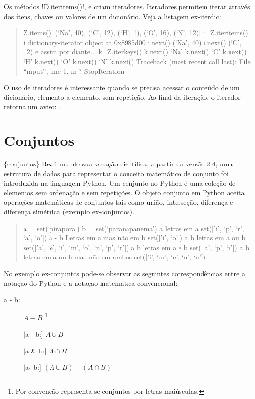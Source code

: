 \documentclass[a4paper,10pt,brazil]{sphinxmanual}
\begin{document}
Os métodos !D.iteritems()!,  e 
criam iteradores. Iteradores permitem iterar através dos ítens,
chaves ou valores de um dicionário. Veja a listagem ex-iterdic:
\begin{quote}

Z.items() {[}(`Na', 40), (`C', 12), (`H', 1), (`O', 16), (`N', 12){]}
i=Z.iteritems() i dictionary-iterator object at 0x8985d00 i.next()
(`Na', 40) i.next() (`C', 12) e assim por diante... k=Z.iterkeys()
k.next() `Na' k.next() `C' k.next() `H' k.next() `O' k.next() `N'
k.next() Traceback (most recent call last): File ``input'', line 1,
in ? StopIteration
\end{quote}

O uso de iteradores é interessante quando se precisa acessar o
conteúdo de um dicionário, elemento-a-elemento, sem repetição. Ao
final da iteração, o iterador retorna um aviso: .


\section{Conjuntos}
\label{Cap2:conjuntos}
\{conjuntos\} Reafirmando sua vocação científica, a partir da versão
2.4, uma estrutura de dados para representar o conceito matemático
de conjunto foi introduzida na linguagem Python. Um conjunto no
Python é uma coleção de elementos sem ordenação e sem repetições. O
objeto conjunto em Python aceita operações matemáticas de conjuntos
tais como união, interseção, diferença e diferença simétrica
(exemplo ex-conjuntos).
\begin{quote}

a = set(`pirapora') b = set(`paranapanema') a letras em a set({[}'i',
`p', `r', `a', `o'{]}) a - b Letras em a mas não em b set({[}'i', `o'{]})
a b letras em a ou b set({[}'a', `e', `i', `m', `o', `n', `p', `r'{]})
a b letras em a e b set({[}'a', `p', `r'{]}) a b letras em a ou b mas
não em ambos set({[}'i', `m', `e', `o', `n'{]})
\end{quote}

No exemplo ex-conjuntos pode-se observar as seguintes
correspondências entre a notação do Python e a notação matemática
convencional:
\begin{description}
\item[{a - b:}] \leavevmode
$A-B$ \footnote{
Por convenção representa-se conjuntos por letras maiúsculas.
}

{[}a $\mid$ b:{]} $A\cup B$

{[}a \& b:{]} $A\cap B$

{[}a $\hat{ }$ b:{]} $(A\cup B)-(A\cap B)$

\end{description}
\end{document}
